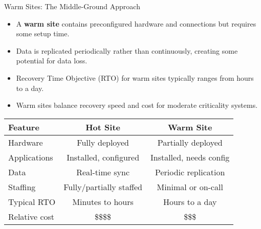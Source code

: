 \documentclass{beamer}
\begin{document}
\begin{frame}{Warm Sites: The Middle-Ground Approach}
    \begin{itemize}
        \item A \textbf{warm site} contains preconfigured hardware and connections but requires some setup time.
        \item Data is replicated periodically rather than continuously, creating some potential for data loss.
        \item Recovery Time Objective (RTO) for warm sites typically ranges from hours to a day.
        \item Warm sites balance recovery speed and cost for moderate criticality systems.
    \end{itemize}
    
    \begin{table}
        \centering
        \begin{tabular}{lcc}
            \toprule
            \textbf{Feature} & \textbf{Hot Site} & \textbf{Warm Site} \\
            \midrule
            Hardware & Fully deployed & Partially deployed \\
            Applications & Installed, configured & Installed, needs config \\
            Data & Real-time sync & Periodic replication \\
            Staffing & Fully/partially staffed & Minimal or on-call \\
            Typical RTO & Minutes to hours & Hours to a day \\
            Relative cost & \$\$\$\$ & \$\$\$ \\
            \bottomrule
        \end{tabular}
    \end{table}
\end{frame}
\end{document}
